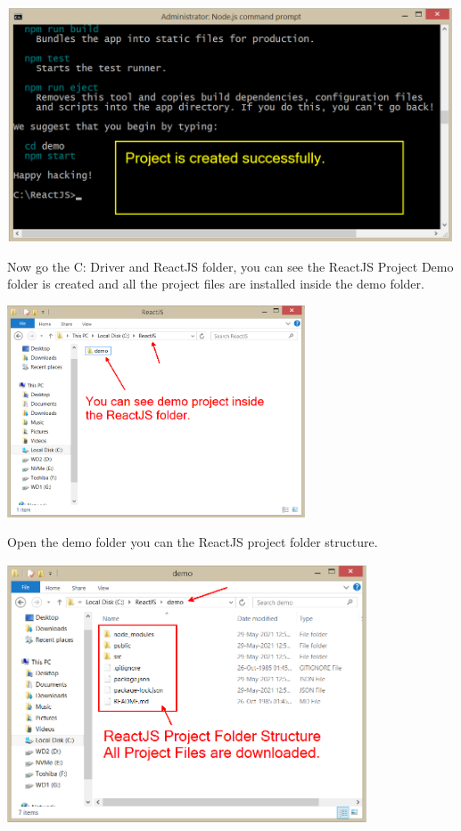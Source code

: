 \documentclass{article}
\begin{document}
\begin{center}
	\noindent \includegraphics*[width=5.20in, height=2.74in]{IMG-06-34}
\end{center}
\newpage
\noindent Now go the C: Driver and ReactJS folder, you can see the ReactJS Project Demo folder is created and all the project files are installed inside the demo folder.
 

\begin{center}
	\noindent \includegraphics*[width=3.48in, height=2.48in]{IMG-06-35}
\end{center}

\noindent  Open the demo folder you can the ReactJS project folder structure.
 

\begin{center}
	\noindent \includegraphics*[width=4.20in, height=3.04in]{IMG-06-36}
\end{center}
\end{document}
